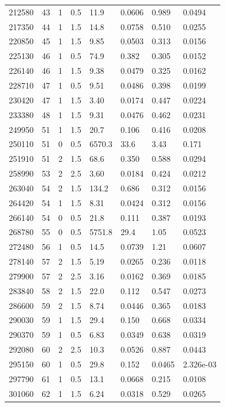 \documentclass[preview]{standalone}
\begin{document}
{{{\begin{tabular}{L{1.2cm}C{1.2cm} C{0.3cm}C{0.5cm} C{1.4cm}C{1.4cm} C{1.4cm}C{1.4cm}}
  212580  &    43  & 1     & 0.5 &  11.9  & 0.0606  & 0.989 &  0.0494   \\ 
  217350  &    44  & 1     & 1.5 &  14.8  & 0.0758  & 0.510 &  0.0255   \\ 
  220850  &    45  & 1     & 1.5 &  9.85  & 0.0503  & 0.313 &  0.0156   \\ 
  225130  &    46  & 1     & 0.5 &  74.9  & 0.382  & 0.305 &  0.0152   \\ 
  226140  &    46  & 1     & 1.5 &  9.38  & 0.0479  & 0.325 &  0.0162   \\ 
  228710  &    47  & 1     & 0.5 &  9.51  & 0.0486  & 0.398 &  0.0199   \\ 
  230420  &    47  & 1     & 1.5 &  3.40  & 0.0174  & 0.447 &  0.0224   \\ 
  233380  &    48  & 1     & 1.5 &  9.31  & 0.0476  & 0.462 &  0.0231   \\ 
  249950  &    51  & 1     & 1.5 &  20.7  & 0.106  & 0.416 &  0.0208   \\ 
  250110  &    51  & 0     & 0.5 &  6570.3  & 33.6  & 3.43 &  0.171   \\ 
  251910  &    51  & 2     & 1.5 &  68.6  & 0.350  & 0.588 &  0.0294   \\ 
  258990  &    53  & 2     & 2.5 &  3.60  & 0.0184  & 0.424 &  0.0212   \\ 
  263040  &    54  & 2     & 1.5 &  134.2  & 0.686  & 0.312 &  0.0156   \\ 
  264420  &    54  & 1     & 1.5 &  8.31  & 0.0424  & 0.312 &  0.0156   \\ 
  266140  &    54  & 0     & 0.5 &  21.8  & 0.111  & 0.387 &  0.0193   \\ 
  268780  &    55  & 0     & 0.5 &  5751.8  & 29.4  & 1.05 &  0.0523   \\ 
  272480  &    56  & 1     & 0.5 &  14.5  & 0.0739  & 1.21 &  0.0607   \\ 
  278140  &    57  & 2     & 1.5 &  5.19  & 0.0265  & 0.236 &  0.0118   \\ 
  279900  &    57  & 2     & 2.5 &  3.16  & 0.0162  & 0.369 &  0.0185   \\ 
  283840  &    58  & 2     & 1.5 &  22.0  & 0.112  & 0.547 &  0.0273   \\ 
  286600  &    59  & 2     & 1.5 &  8.74  & 0.0446  & 0.365 &  0.0183   \\ 
  290030  &    59  & 1     & 1.5 &  29.4  & 0.150  & 0.668 &  0.0334   \\ 
  290370  &    59  & 1     & 0.5 &  6.83  & 0.0349  & 0.638 &  0.0319   \\ 
  292080  &    60  & 2     & 2.5 &  10.3  & 0.0526  & 0.887 &  0.0443   \\ 
  295150  &    60  & 1     & 0.5 &  29.8  & 0.152  & 0.0465 &  2.326e-03   \\ 
  297790  &    61  & 1     & 0.5 &  13.1  & 0.0668  & 0.215 &  0.0108   \\ 
  301060  &    62  & 1     & 1.5 &  6.24  & 0.0318  & 0.529 &  0.0265   \\ 
\hline 
\end{tabular} 

}}}
\end{document}
